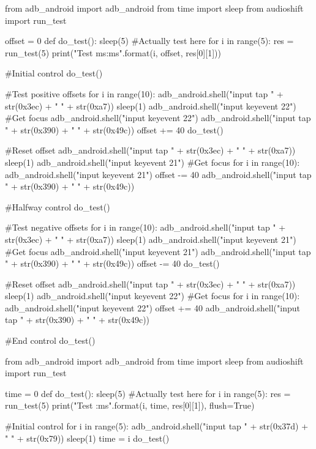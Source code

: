 \begin{mdframed}
    \begin{python}
from adb_android import adb_android
from time import sleep
from audioshift import run_test

offset = 0
def do_test():
    sleep(5)
    #Actually test here
    for i in range(5):
        res = run_test(5)
        print("Test {} {}ms:{}ms".format(i, offset, res[0][1]))

#Initial control
do_test()

#Test positive offsets
for i in range(10):
    adb_android.shell("input tap " + str(0x3ec) + " " + str(0xa7))
    sleep(1)
    adb_android.shell("input keyevent 22") #Get focus
    adb_android.shell("input keyevent 22")
    adb_android.shell("input tap " + str(0x390) + " " + str(0x49c))
    offset += 40
    do_test()

#Reset offset
adb_android.shell("input tap " + str(0x3ec) + " " + str(0xa7))
sleep(1)
adb_android.shell("input keyevent 21") #Get focus
for i in range(10):
    adb_android.shell("input keyevent 21")
    offset -= 40
adb_android.shell("input tap " + str(0x390) + " " + str(0x49c))

#Halfway control
do_test()

#Test negative offsets
for i in range(10):
    adb_android.shell("input tap " + str(0x3ec) + " " + str(0xa7))
    sleep(1)
    adb_android.shell("input keyevent 21") #Get focus
    adb_android.shell("input keyevent 21")
    adb_android.shell("input tap " + str(0x390) + " " + str(0x49c))
    offset -= 40
    do_test()

#Reset offset
adb_android.shell("input tap " + str(0x3ec) + " " + str(0xa7))
sleep(1)
adb_android.shell("input keyevent 22") #Get focus
for i in range(10):
    adb_android.shell("input keyevent 22")
    offset += 40
adb_android.shell("input tap " + str(0x390) + " " + str(0x49c))

#End control
do_test()
    \end{python}
    \label{soundseeder_manualoffset}
\end{mdframed}
\clearpage

\begin{mdframed}
    \begin{python}
from adb_android import adb_android
from time import sleep
from audioshift import run_test

time = 0
def do_test():
    sleep(5)
    #Actually test here
    for i in range(5):
        res = run_test(5)
        print("Test {} {}:{}ms".format(i, time, res[0][1]), flush=True)

#Initial control
for i in range(5):
    adb_android.shell("input tap " + str(0x37d) + " " + str(0x79))
    sleep(1)
    time = i
    do_test()
    \end{python}
    \label{soundseeder_resync}
\end{mdframed}
\clearpage
